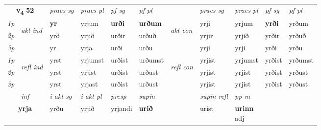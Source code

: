 \noindent
\begin{tabular}{lllllllllll} \toprule
\multicolumn{2}{c}{\textbf{v{\textsubscript{4}}} \Large{\textbf{52}}}  &  \textit{praes sg}  & \textit{praes pl}  &\textit{ pf sg} & \textit{pf pl} &  &  \textit{praes sg}  & \textit{praes pl}  & \textit{pf sg} & \textit{pf pl } \\*
	\cmidrule{3-6} \cmidrule{8-11}
 {\textit{1p}} & \multirow{3}{*}{\begin{turn}{90}\textit{akt ind}\end{turn}} & \textbf{yr} & yrjum & \textbf{urði} & \textbf{urðum} & \multirow{3}{*}{\begin{turn}{90}\textit{akt con}\end{turn}} &yrji & yrjum & \textbf{yrði} & yrðum\\*
 {\textit{2p}} &  &  yrð  & yrjið & urðir & urðuð & & yrjir & yrjið & yrðir & yrðuð \\*
{\textit{3p}} &  & yr & yrja & urði & urðu & & yrji & yrji& yrði & yrðu \\*
\cmidrule{3-6} \cmidrule{8-11}
 {\textit{1p}} & \multirow{3}{*}{\begin{turn}{90}\textit{refl ind}\end{turn}}  & yrst & yrjumst & urðist & urðumst & \multirow{3}{*}{\begin{turn}{90}\textit{refl con}\end{turn}}  &yrjist & yrjumst & yrðist & yrðumst \\*
 {\textit{2p}} &  & yrst & yrjist & urðist & urðust & &yrjist & yrjist & yrðist & yrðust \\*
 {\textit{3p}}  & & yrst & yrjast & urðist & urðust & & yrjist & yrjist& yrðist & yrðust \\*
\cmidrule{3-6} \cmidrule{8-11}

   \multicolumn{2}{c}{\textit{inf}}  & \textit{i akt sg} & \textit{i akt pl}   & \textit{presp} & \textit{supin} && \textit{supin refl} & \textit{pp m} \\*
  \multicolumn{2}{c}{\textbf{yrja}} & yrðu  & yrjið   & yrjandi &  \textbf{urið} && urist & \specialcell{\textbf{urinn} \\ adj\textbf{\textsubscript{}}} \\*
\end{tabular}

